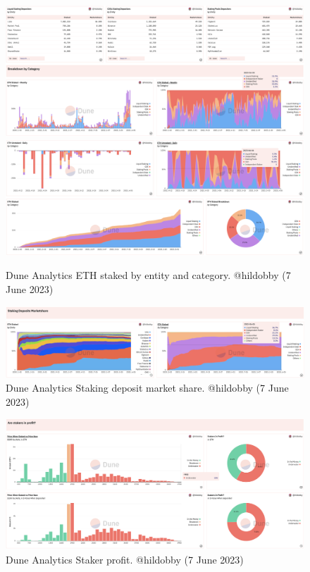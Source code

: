 \documentclass[UTF8]{article}
\begin{document}
{\begin{figure}[htbp]
\begin{center}
\includegraphics[width=\linewidth]{images/hildobby8}\\
\includegraphics[width=\linewidth]{images/hildobby9}
\caption{Dune Analytics ETH staked by entity and category. @hildobby  (7 June 2023)}
\label{fig:hildobby8}
\end{center}
\end{figure}


\begin{figure}[htbp]
\begin{center}
\includegraphics[width=\linewidth]{images/hildobby10}
\caption{Dune Analytics Staking deposit market share. @hildobby  (7 June 2023)}
\label{fig:hildobby=10}
\end{center}
\end{figure}

\begin{figure}[htbp]
\begin{center}
\includegraphics[width=\linewidth]{images/hildobby11}
\caption{Dune Analytics Staker profit. @hildobby  (7 June 2023)}
\label{fig:hildobby=11}
\end{center}
\end{figure}


}
\end{document}
